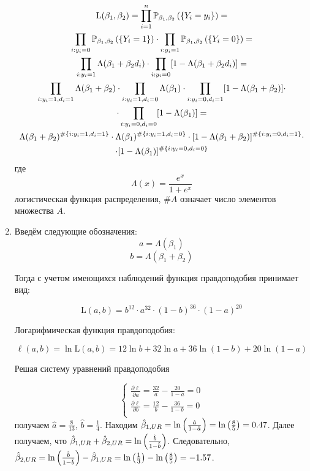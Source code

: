 \begin{problem}
\begin{sol}
\begin{enumerate}
\begin{multline*}
\text{L}(\beta_1, \beta_2) = \prod_{i=1}^n \P_{\beta_1, \beta_2} \left(\left\lbrace Y_i = y_i \right\rbrace \right) =\\
 \prod_{i: y_i = 0} \P_{\beta_1, \beta_2} \left(\left\lbrace Y_i = 1 \right\rbrace \right) \cdot \prod_{i: y_i = 1} \P_{\beta_1, \beta_2} \left(\left\lbrace Y_i = 0 \right\rbrace \right) =\\
\prod_{i: y_i = 1} \Lambda(\beta_1 + \beta_2 d_i) \cdot \prod_{i: y_i = 0} [1 - \Lambda(\beta_1 + \beta_2 d_i)] = \\
\prod_{i: y_i = 1, d_i = 1} \Lambda(\beta_1 + \beta_2) \cdot \prod_{i: y_i = 1, d_i = 0} \Lambda(\beta_1) \cdot \prod_{i: y_i = 0, d_i = 1} [1 - \Lambda(\beta_1 + \beta_2)] \cdot \\
\cdot \prod_{i: y_i = 0, d_i = 0} [1 - \Lambda(\beta_1)] = \\
\Lambda(\beta_1 + \beta_2)^{\#\{i: y_i=1, d_i=1\}} \cdot \Lambda(\beta_1)^{\#\{i: y_i=1, d_i=0\}} \cdot [1 - \Lambda(\beta_1 + \beta_2)]^{\#\{i: y_i=0, d_i=1\}} \cdot \\
\cdot  [1 - \Lambda(\beta_1)]^{\#\{i: y_i=0, d_i=0\}}
\end{multline*}
где
\[
\Lambda(x) = \frac{e^x}{1 + e^x}
\]
логистическая функция распределения, $\#A$ означает число элементов множества $A$.

\item Введём следующие обозначения:
\[
a = \Lambda(\beta_1)
\]
\[
b = \Lambda(\beta_1 + \beta_2)
\]



Тогда с учетом имеющихся наблюдений функция правдоподобия принимает вид:

\[
\text{L}(a, b) = b^{12} \cdot a^{32} \cdot (1 - b)^{36} \cdot (1 - a)^{20}
\]

Логарифмическая функция правдоподобия:

\[
\ell(a, b) = \ln \text{L}(a, b) = 12\ln b + 32\ln a + 36\ln(1-b) + 20\ln(1 - a)
\]

Решая систему уравнений правдоподобия

\[
\begin{cases}
\frac{\partial \ell}{\partial a} = \frac{32}{a} - \frac{20}{1 - a} = 0 \\
\frac{\partial \ell}{\partial b} = \frac{12}{b} - \frac{36}{1 - b} = 0 \\
\end{cases}
\]
получаем $\hat{a} = \frac{8}{13}$, $\hat{b} = \frac{1}{4}$. Находим $\hb_{1, UR} = \ln\left( \frac{\hat{a}}{1 - \hat{a}} \right)= \ln \left(\frac{8}{5} \right) = 0.47$. Далее получаем, что $\hb_{1, UR} + \hb_{2, UR} = \ln \left( \frac{\hat{b}}{1 - \hat{b}} \right)$. Следовательно, $\hb_{2, UR} = \ln \left( \frac{\hat{b}}{1 - \hat{b}} \right) - \hb_{1, UR} = \ln \left( \frac{1}{3} \right) - \ln \left( \frac{8}{5} \right) = -1.57$.


\end{enumerate}
\end{sol}
\end{problem}
